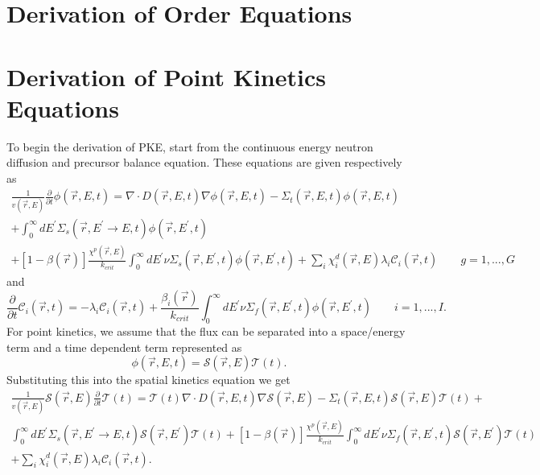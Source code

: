 \documentclass{ansconf}
\numberwithin{equation}{section}
\begin{document}
\section{Derivation of Order Equations}

\section{Derivation of Point Kinetics Equations} \label{app:pkes}

To begin the derivation of PKE, start from the continuous energy neutron diffusion and precursor balance equation. These equations are given respectively as
\begin{multline}
\frac{1}{v\left(\vec{r},E\right)}\frac{\partial}{\partial t}\phi\left(\vec{r},E,t\right)=\nabla\cdot D\left(\vec{r},E,t\right)\nabla\phi\left(\vec{r},E,t\right)-
\Sigma_{t}\left(\vec{r},E,t\right)\phi\left(\vec{r},E,t\right)\\ 
+\int_{0}^{\infty}dE^{\prime}\Sigma_{s}\left(\vec{r},E^{\prime}
\rightarrow E,t\right)\phi\left(\vec{r},E^{\prime},t\right)\\ 
+\left[1-\beta\left(\vec{r}\right)\right]
\frac{\chi^{p}\left(\vec{r},E\right)}{k_{crit}}\int_{0}^{\infty}dE^{\prime}\nu\Sigma_{s}
\left(\vec{r},E^{\prime},t\right)
\phi\left(\vec{r},E^{\prime},t\right)+
\sum_{i}\chi_{i}^{d}\left(\vec{r},E\right)
\lambda_{i}\mathcal{C}_{i}\left(\vec{r},t\right)\qquad g=1,...,G
\end{multline}
and
\begin{equation}
\frac{\partial}{\partial t}\mathcal{C}_{i}\left(\vec{r},t\right)=-\lambda_{i}\mathcal{C}_{i}\left(\vec{r},t\right)+\frac{\beta_{i}\left(\vec{r}\right)}{k_{crit}}\int_{0}^{\infty}dE^{\prime}\nu\Sigma_{f}\left(\vec{r},E^{\prime},t\right)\phi\left(\vec{r},E^{\prime},t\right)\qquad i=1,...,I.
\end{equation}
For point kinetics, we assume that the flux can be separated into a space/energy term and a time dependent term represented as 
\begin{equation}
\phi\left(\vec{r},E,t\right)=\mathcal{S}\left(\vec{r},E\right)
\mathcal{T}\left(t\right).
\end{equation}
 Substituting this into the spatial kinetics equation we get
\begin{multline}
\frac{1}{v\left(\vec{r},E\right)}\mathcal{S}\left(\vec{r},E\right)\frac{\partial}{\partial t}\mathcal{T}\left(t\right)=\mathcal{T}\left(t\right)\nabla\cdot D\left(\vec{r},E,t\right)\nabla\mathcal{S}\left(\vec{r},E\right)-\Sigma_{t}\left(\vec{r},E,t\right)\mathcal{S}\left(\vec{r},E\right)\mathcal{T}\left(t\right)+\\
\int_{0}^{\infty}dE^{\prime}\Sigma_{s}\left(\vec{r},E^{\prime}\rightarrow E,t\right)\mathcal{S}\left(\vec{r},E^{\prime}\right)\mathcal{T}\left(t\right)+\left[1-\beta\left(\vec{r}\right)\right]\frac{\chi^{p}\left(\vec{r},E\right)}{k_{crit}}\int_{0}^{\infty}dE^{\prime}\nu\Sigma_{f}\left(\vec{r},E^{\prime},t\right)\mathcal{S}\left(\vec{r},E^{\prime}\right)\mathcal{T}\left(t\right)\\
+\sum_{i}\chi_{i}^{d}\left(\vec{r},E\right)\lambda_{i}\mathcal{C}_{i}\left(\vec{r},t\right).
\end{multline}
\end{document}
